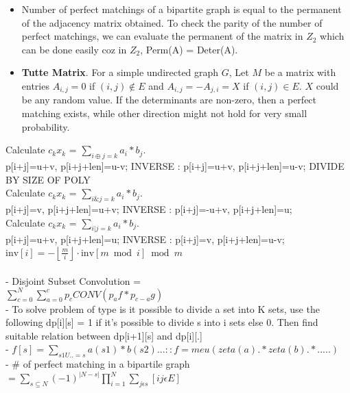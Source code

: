 \begin{itemize}
\item Number of perfect matchings of a bipartite graph is equal to the permanent of the adjacency matrix obtained. To check the parity of the number of perfect matchings, we can evaluate the permanent of the matrix in $Z_{2}$ which can be done easily coz in $Z_{2}$, Perm(A) = Deter(A).
\item \textbf{Tutte Matrix}. For a simple undirected graph $G$, Let $M$ be a matrix with entries $A_{i, j} = 0$ if $(i, j) \notin E$ and $A_{i, j} = -A_{j, i} = X$ if $(i, j) \in E$. $X$ could be any random value. If the determinants are non-zero, then a perfect matching exists, while other direction might not hold for very small probability.\\
\end{itemize}
 Calculate $c_{k}x_{k}$ = $\sum_{i \oplus j = k}a_{i}*b_{j}$. \\
p[i+j]=u+v, p[i+j+len]=u-v; INVERSE : p[i+j]=u+v, p[i+j+len]=u-v; DIVIDE BY SIZE OF POLY\\
 Calculate $c_{k}x_{k}$ = $\sum_{i \& j = k}a_{i}*b_{j}$. \\
p[i+j]=v, p[i+j+len]=u+v; INVERSE : p[i+j]=-u+v, p[i+j+len]=u; \\
 Calculate $c_{k}x_{k}$ = $\sum_{i | j = k}a_{i}*b_{j}$. \\
p[i+j]=u+v, p[i+j+len]=u; INVERSE : p[i+j]=v, p[i+j+len]=u-v;\\ 
 $\text{inv}[i] = - \left\lfloor \frac{m}{i} \right\rfloor \cdot \text{inv}[m \bmod i] \bmod m$
\\
 \\
- Disjoint Subset Convolution = \\
$ \sum_{c=0}^{N} \sum_{a=0}^{c} p_{c} CONV(p_{a}f * p_{c-a}g) $\\
- To solve problem of type is it possible to divide a set into K sets, use the following dp[i][s] = 1 if it's possible to divide s into i sets else 0. Then find suitable relation between dp[i+1][s] and dp[i][.] \\
- $ f[s] = \sum_{s1 U .. = s}{} a(s1) * b(s2) ... :: f = meu(zeta(a).*zeta(b).*.....) $ \\ - \# of perfect matching in a bipartile graph $ = \sum_{s \subseteq N} (-1)^{|N-s|} \prod_{i=1}^{N} \sum_{j \epsilon s} [ij \epsilon E]$ \\
